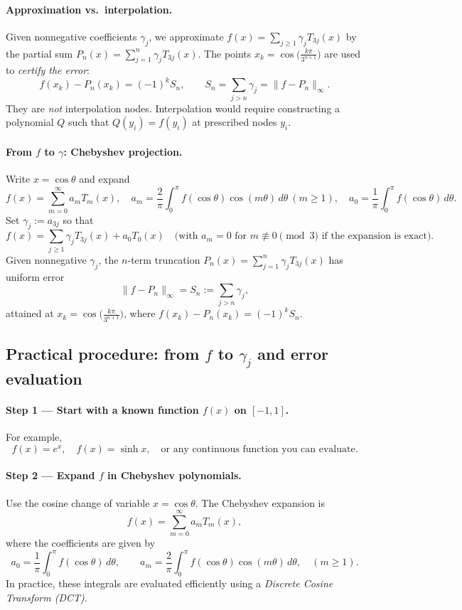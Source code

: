 \documentclass[12pt,a4paper]{article}
\theoremstyle{plain}
\theoremstyle{definition}
\theoremstyle{remark}
\theoremstyle{remark}
\begin{document}
	
	\paragraph{Approximation vs.\ interpolation.}
	Given nonnegative coefficients $\gamma_j$, we approximate
	$f(x)=\sum_{j\ge1}\gamma_j T_{3j}(x)$ by the partial sum
	$P_n(x)=\sum_{j=1}^{n}\gamma_j T_{3j}(x)$.
	The points $x_k=\cos\!\big(\frac{k\pi}{3^{n+1}}\big)$ are used to
	\emph{certify the error}:
	\[
	f(x_k)-P_n(x_k)=(-1)^k S_n,\qquad S_n=\sum_{j>n}\gamma_j=\|f-P_n\|_\infty.
	\]
	They are \emph{not} interpolation nodes. Interpolation would require constructing
	a polynomial $Q$ such that $Q(y_i)=f(y_i)$ at prescribed nodes $y_i$.
	
\paragraph{From $f$ to $\gamma$: Chebyshev projection.}
Write $x=\cos\theta$ and expand
\[
f(x)=\sum_{m=0}^\infty a_m T_m(x),
\quad
a_m=\frac{2}{\pi}\int_{0}^{\pi} f(\cos\theta)\cos(m\theta)\,d\theta\ (m\ge1),\quad
a_0=\frac{1}{\pi}\int_{0}^{\pi} f(\cos\theta)\,d\theta.
\]
Set $\gamma_j:=a_{3j}$ so that
\[
f(x)=\sum_{j\ge1}\gamma_j T_{3j}(x)+a_0 T_0(x)
\quad\text{(with $a_m=0$ for $m\not\equiv 0\!\!\!\pmod 3$ if the expansion is exact).}
\]
Given nonnegative $\gamma_j$, the $n$-term truncation $P_n(x)=\sum_{j=1}^n\gamma_j T_{3j}(x)$
has uniform error
\[
\|f-P_n\|_\infty = S_n:=\sum_{j>n}\gamma_j,
\]
attained at $x_k=\cos\!\big(\frac{k\pi}{3^{n+1}}\big)$, where
$f(x_k)-P_n(x_k)=(-1)^k S_n$.

\subsection*{Practical procedure: from $f$ to $\gamma_j$ and error evaluation}

\paragraph{Step 1 — Start with a known function $f(x)$ on $[-1,1]$.}
For example,
\[
f(x)=e^x,\quad f(x)=\sinh x,\quad\text{or any continuous function you can evaluate.}
\]

\paragraph{Step 2 — Expand $f$ in Chebyshev polynomials.}
Use the cosine change of variable $x=\cos\theta$.
The Chebyshev expansion is
\[
f(x)=\sum_{m=0}^{\infty} a_m T_m(x),
\]
where the coefficients are given by
\[
a_0=\frac{1}{\pi}\int_0^{\pi} f(\cos\theta)\,d\theta,
\qquad
a_m=\frac{2}{\pi}\int_0^{\pi} f(\cos\theta)\cos(m\theta)\,d\theta,
\quad (m\ge1).
\]
In practice, these integrals are evaluated efficiently using a
\emph{Discrete Cosine Transform (DCT)}.
\end{document}
